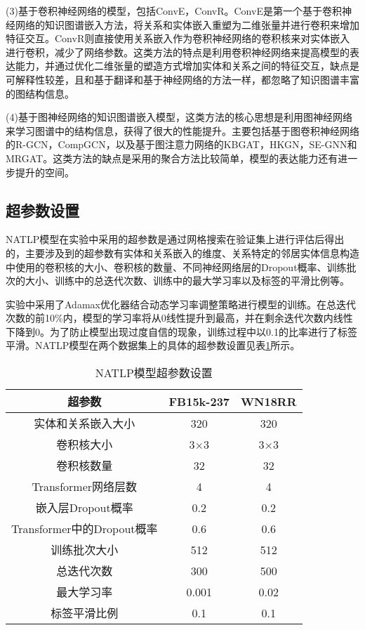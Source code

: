 (3)基于卷积神经网络的模型，包括ConvE，ConvR。ConvE是第一个基于卷积神经网络的知识图谱嵌入方法，将关系和实体嵌入重塑为二维张量并进行卷积来增加特征交互。ConvR则直接使用关系嵌入作为卷积神经网络的卷积核来对实体嵌入进行卷积，减少了网络参数。这类方法的特点是利用卷积神经网络来提高模型的表达能力，并通过优化二维张量的塑造方式增加实体和关系之间的特征交互，缺点是可解释性较差，且和基于翻译和基于神经网络的方法一样，都忽略了知识图谱丰富的图结构信息。

(4)基于图神经网络的知识图谱嵌入模型，这类方法的核心思想是利用图神经网络来学习图谱中的结构信息，获得了很大的性能提升。主要包括基于图卷积神经网络的R-GCN，CompGCN，以及基于图注意力网络的KBGAT，HKGN，SE-GNN和MRGAT。这类方法的缺点是采用的聚合方法比较简单，模型的表达能力还有进一步提升的空间。

\subsection{超参数设置}

NATLP模型在实验中采用的超参数是通过网格搜索在验证集上进行评估后得出的，主要涉及到的超参数有实体和关系嵌入的维度、关系特定的邻居实体信息构造中使用的卷积核的大小、卷积核的数量、不同神经网络层的Dropout概率、训练批次的大小、训练中的总迭代次数、训练中的最大学习率以及标签的平滑比例等。

实验中采用了Adamax优化器结合动态学习率调整策略进行模型的训练。在总迭代次数的前10\%内，模型的学习率将从0线性提升到最高，并在剩余迭代次数内线性下降到0。为了防止模型出现过度自信的现象，训练过程中以0.1的比率进行了标签平滑。NATLP模型在两个数据集上的具体的超参数设置见表\ref{NALTP_hyperparameter}所示。

\begin{table}[htbp]
  \renewcommand\arraystretch{1.5}
  \caption{NATLP模型超参数设置}
  \centering
  \begin{tabular}{*{3}{c}}
    \toprule
    超参数 & FB15k-237 & WN18RR\\
    \midrule
    实体和关系嵌入大小  & 320 & 320 \\
    卷积核大小 & 3$\times$3 & 3$\times$3\\
    卷积核数量 & 32 & 32\\
    Transformer网络层数& 4 & 4\\
    嵌入层Dropout概率 & 0.2 & 0.2\\
    Transformer中的Dropout概率 & 0.6 & 0.6\\
    训练批次大小 & 512 & 512\\
    总迭代次数& 300 & 500 \\
    最大学习率 & 0.001 & 0.02\\
    标签平滑比例 & 0.1 & 0.1\\
    \bottomrule
  \end{tabular}
  \label{NALTP_hyperparameter}
\end{table}

